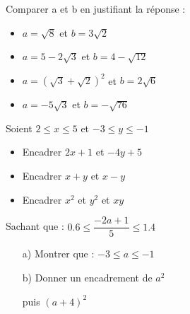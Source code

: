 \documentclass[a4paper,12pt]{article}
\begin{document}
\devoir[prv=true,ds=false,num=2 ,niv=3 , date=24/11/2023,Rdate=27/11/2023 ]

\begin{exo}
\begin{enumerate}
\item Comparer a et b en justifiant la réponse :

\begin{minipage}{.5\linewidth}
\begin{itemize}
\item $ a=\sqrt{8}$ et $ b=3\sqrt{2}$
\item $a=5-2\sqrt{3} $ et $  b=4-\sqrt{12}$
\end{itemize}
\end{minipage}
\begin{minipage}{.5\linewidth}
\begin{itemize}
\item $ a=(\sqrt{3}+\sqrt{2})^{2}$ et $ b=2\sqrt{6}$
\item $ a=-5\sqrt{3}$ et $ b=-\sqrt{76}$
\end{itemize}
\end{minipage}
\begin{minipage}{.5\textwidth}
\item Soient $2\leq x\leq 5$ et $-3\leq y\leq -1$
\begin{itemize}
\item Encadrer $2x+1$ et $-4y+5$
\item Encadrer $x+y$ et $x-y$
\item Encadrer $x^{2}$ et $y^{2}$ et $xy$
\end{itemize}
\end{minipage}
\begin{minipage}{.5\textwidth}
\item Sachant que : $0.6\leq \dfrac{-2a+1}{5} \leq 1.4$
\begin{itemize}
\item[a)] Montrer que : $-3\leq a \leq -1$
\item[b)] Donner un encadrement de $a^{2}$

 puis $(a+4)^{2}$
\end{itemize}
\end{minipage}
\end{enumerate}
\end{exo}
\end{document}
